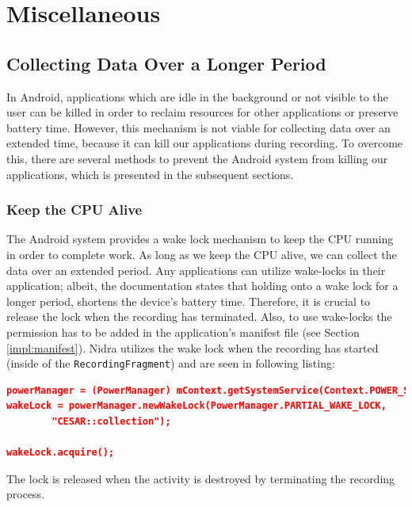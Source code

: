 

\section{Miscellaneous}

\subsection{Collecting Data Over a Longer Period}
In Android, applications which are idle in the background or not visible to the user can be killed in order to reclaim resources for other applications or preserve battery time. However, this mechanism is not viable for collecting data over an extended time, because it can kill our applications during recording. To overcome this, there are several methods to prevent the Android system from killing our applications, which is presented in the subsequent sections.

\subsubsection{Keep the CPU Alive}
The Android system provides a wake lock mechanism to keep the CPU running in order to complete work. As long as we keep the CPU alive, we can collect the data over an extended period. Any applications can utilize wake-locks in their application; albeit, the documentation states that holding onto a wake lock for a longer period, shortens the device's battery time. Therefore, it is crucial to release the lock when the recording has terminated. Also, to use wake-locks the permission has to be added in the application's manifest file (see Section \ref{impl:manifest}). Nidra utilizes the wake lock when the recording has started (inside of the \verb|RecordingFragment|) and are seen in following listing:

\begin{lstlisting}[language=json, caption={}, captionpos=b]
powerManager = (PowerManager) mContext.getSystemService(Context.POWER_SERVICE);
wakeLock = powerManager.newWakeLock(PowerManager.PARTIAL_WAKE_LOCK,
        "CESAR::collection");

wakeLock.acquire();
\end{lstlisting}
The lock is released when the activity is destroyed by terminating the recording process.


